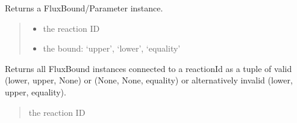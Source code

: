 \documentclass[letterpaper,12pt,english]{sphinxmanual}
\begin{document}
\begin{fulllineitems}
\begin{fulllineitems}
\begin{quote}
\begin{description}
\end{description}\end{quote}

\end{fulllineitems}


\begin{fulllineitems}
\label{\detokenize{api/core:cbmpy.CBModel.Model.getFluxBoundByReactionID}}
\pysigstartsignatures
\pysiglinewithargsret
{}
{\sphinxparamcomma {}}
{}
\pysigstopsignatures
\sphinxAtStartPar
Returns a FluxBound/Parameter instance.
\begin{quote}\begin{description}
\begin{itemize}
\item {} 
\sphinxAtStartPar
{} \textendash{} the reaction ID

\item {} 
\sphinxAtStartPar
{} \textendash{} the bound: ‘upper’, ‘lower’, ‘equality’

\end{itemize}

\end{description}\end{quote}

\end{fulllineitems}


\begin{fulllineitems}
\label{\detokenize{api/core:cbmpy.CBModel.Model.getFluxBoundsByReactionID}}
\pysigstartsignatures
\pysiglinewithargsret
{}
{}
{}
\pysigstopsignatures
\sphinxAtStartPar
Returns all FluxBound instances connected to a reactionId as a tuple of valid (lower, upper, None) or (None, None, equality) or alternatively invalid (lower, upper, equality).
\begin{quote}\begin{description}
\sphinxAtStartPar
{} \textendash{} the reaction ID


\end{description}
\end{quote}
\end{fulllineitems}
\end{fulllineitems}
\end{document}
